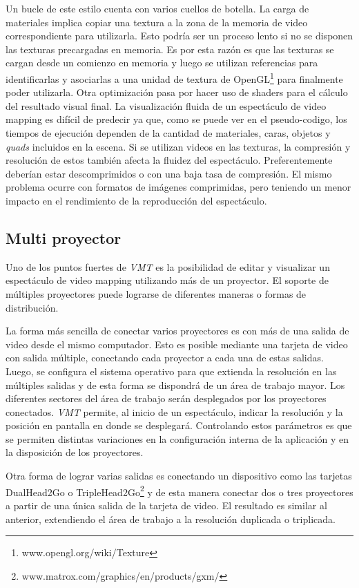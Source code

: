 Un bucle de este estilo cuenta con varios cuellos de botella.
La carga de materiales implica copiar una textura a la zona de la memoria de video correspondiente para utilizarla. Esto podría ser un proceso lento si no se disponen las texturas precargadas en memoria. Es por esta razón es que las texturas se cargan desde un comienzo en memoria y luego se utilizan referencias para identificarlas y asociarlas a una unidad de textura de OpenGL\footnote{www.opengl.org/wiki/Texture} para finalmente poder utilizarla.
Otra optimización pasa por hacer uso de shaders para el cálculo del resultado visual final.
La visualización fluida de un espectáculo de video mapping es difícil de predecir ya que, como se puede ver en el pseudo-codigo, los tiempos de ejecución dependen de la cantidad de materiales, caras, objetos y \emph{quads} incluidos en la escena.
Si se utilizan videos en las texturas, la compresión y resolución de estos también afecta la fluidez del espectáculo. Preferentemente deberían estar descomprimidos o con una baja tasa de compresión. El mismo problema ocurre con formatos de imágenes comprimidas, pero teniendo un menor impacto en el rendimiento de la reproducción del espectáculo.

\subsection{Multi proyector}

Uno de los puntos fuertes de \emph{VMT} es la posibilidad de editar y visualizar un espectáculo de video mapping utilizando más de un proyector. El soporte de múltiples proyectores puede lograrse de diferentes maneras o formas de distribución.

La forma más sencilla de conectar varios proyectores es con más de una salida de video desde el mismo computador. Esto es posible mediante una tarjeta de video con salida múltiple, conectando cada proyector a cada una de estas salidas. Luego, se configura el sistema operativo para que extienda la resolución en las múltiples salidas y de esta forma se dispondrá de un área de trabajo mayor. Los diferentes sectores del área de trabajo serán desplegados por los proyectores conectados.
\emph{VMT} permite, al inicio de un espectáculo, indicar la resolución y la posición en pantalla en donde se desplegará. Controlando estos parámetros es que se permiten distintas variaciones en la configuración interna de la aplicación y en la disposición de los proyectores.

Otra forma de lograr varias salidas es conectando un dispositivo como las tarjetas DualHead2Go o TripleHead2Go\footnote{www.matrox.com/graphics/en/products/gxm/} y de esta manera conectar dos o tres proyectores a partir de una única salida de la tarjeta de video. El resultado es similar al anterior, extendiendo el área de trabajo a la resolución duplicada o triplicada.

